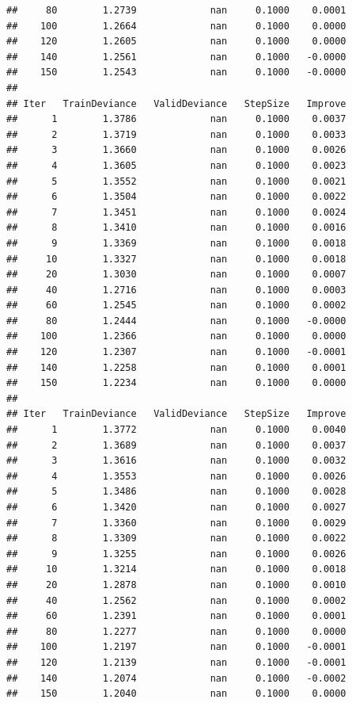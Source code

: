 \documentclass[]{article}
\begin{document}
\begin{verbatim}
##     80        1.2739             nan     0.1000    0.0001
##    100        1.2664             nan     0.1000    0.0000
##    120        1.2605             nan     0.1000    0.0000
##    140        1.2561             nan     0.1000   -0.0000
##    150        1.2543             nan     0.1000   -0.0000
## 
## Iter   TrainDeviance   ValidDeviance   StepSize   Improve
##      1        1.3786             nan     0.1000    0.0037
##      2        1.3719             nan     0.1000    0.0033
##      3        1.3660             nan     0.1000    0.0026
##      4        1.3605             nan     0.1000    0.0023
##      5        1.3552             nan     0.1000    0.0021
##      6        1.3504             nan     0.1000    0.0022
##      7        1.3451             nan     0.1000    0.0024
##      8        1.3410             nan     0.1000    0.0016
##      9        1.3369             nan     0.1000    0.0018
##     10        1.3327             nan     0.1000    0.0018
##     20        1.3030             nan     0.1000    0.0007
##     40        1.2716             nan     0.1000    0.0003
##     60        1.2545             nan     0.1000    0.0002
##     80        1.2444             nan     0.1000   -0.0000
##    100        1.2366             nan     0.1000    0.0000
##    120        1.2307             nan     0.1000   -0.0001
##    140        1.2258             nan     0.1000    0.0001
##    150        1.2234             nan     0.1000    0.0000
## 
## Iter   TrainDeviance   ValidDeviance   StepSize   Improve
##      1        1.3772             nan     0.1000    0.0040
##      2        1.3689             nan     0.1000    0.0037
##      3        1.3616             nan     0.1000    0.0032
##      4        1.3553             nan     0.1000    0.0026
##      5        1.3486             nan     0.1000    0.0028
##      6        1.3420             nan     0.1000    0.0027
##      7        1.3360             nan     0.1000    0.0029
##      8        1.3309             nan     0.1000    0.0022
##      9        1.3255             nan     0.1000    0.0026
##     10        1.3214             nan     0.1000    0.0018
##     20        1.2878             nan     0.1000    0.0010
##     40        1.2562             nan     0.1000    0.0002
##     60        1.2391             nan     0.1000    0.0001
##     80        1.2277             nan     0.1000    0.0000
##    100        1.2197             nan     0.1000   -0.0001
##    120        1.2139             nan     0.1000   -0.0001
##    140        1.2074             nan     0.1000   -0.0002
##    150        1.2040             nan     0.1000    0.0000

\end{verbatim}
\end{document}
